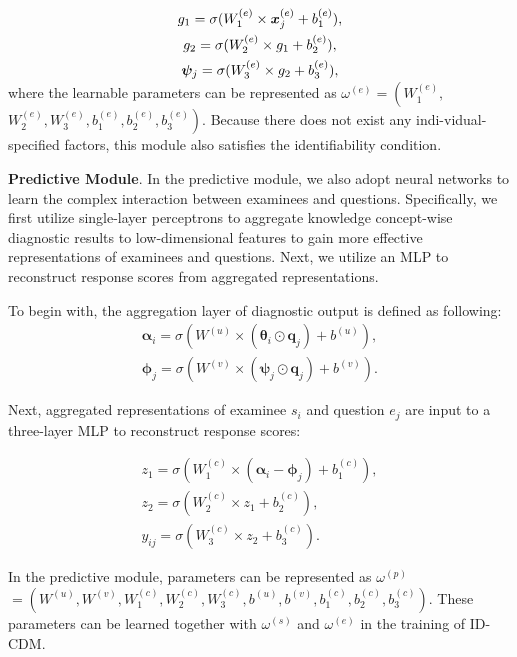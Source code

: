 \documentclass[sigconf]{acmart}
\begin{document}
\vspace{-10pt}
\begin{gather}
  g_1 = \sigma (W^{(e)}_1\times \bm{x}^{(e)}_j + b^{(e)}_1), \\
  g_2 = \sigma (W^{(e)}_2\times g_1+ b^{(e)}_2), \\
  \bm{\psi}_j = \sigma (W^{(e)}_3\times g_2 + b^{(e)}_3),
  \vspace{-5pt}
\end{gather}
where the learnable parameters can be represented as $\omega^{(e)} = \left(W^{(e)}_1,\right.$ $\left.W^{(e)}_2, W^{(e)}_3, b^{(e)}_1, b^{(e)}_2, b^{(e)}_3\right)$. Because there does not exist any indi-vidual-specified factors, this module also satisfies the identifiability condition.

\par \textbf{Predictive Module}. In the predictive module, we also adopt neural networks to learn the complex interaction between examinees and questions. Specifically, we first utilize single-layer perceptrons to aggregate knowledge concept-wise diagnostic results to low-dimensional features to gain more effective representations of examinees and questions. Next, we utilize an MLP to reconstruct response scores from aggregated representations.
\par To begin with, the aggregation layer of diagnostic output is defined as following:
\begin{gather}
  \bm{\alpha}_i = \sigma(W^{(u)}\times (\bm{\theta}_i\odot\bm{q}_j) + b^{(u)}),\\
  \bm{\phi}_j = \sigma(W^{(v)}\times (\bm{\psi}_j\odot\bm{q}_j) + b^{(v)}).
\end{gather}
\par Next, aggregated representations of examinee $s_i$ and question $e_j$ are input to a three-layer MLP to reconstruct response scores:

\vspace{-7pt}
\begin{gather}\label{eq:id-cdm-fin1}
  z_1 = \sigma(W^{(c)}_1\times (\bm{\alpha}_i - \bm{\phi}_j) + b^{(c)}_1),\\\label{eq:id-cdm-fin2}
  z_2 = \sigma(W^{(c)}_2\times z_1 + b^{(c)}_2),\\\label{eq:id-cdm-fin3}
  y_{ij} = \sigma(W^{(c)}_3\times z_2 + b^{(c)}_3).
\end{gather}
\par In the predictive module, parameters can be represented as $\omega^{(p)} $ $= \left(W^{(u)}, W^{(v)}, W^{(c)}_1, W^{(c)}_2, W^{(c)}_3, b^{(u)}, b^{(v)}, b^{(c)}_1, b^{(c)}_2, b^{(c)}_3\right)$. These parameters can be learned together with $\omega^{(s)}$ and $\omega^{(e)}$ in the training of ID-CDM.
\end{document}
